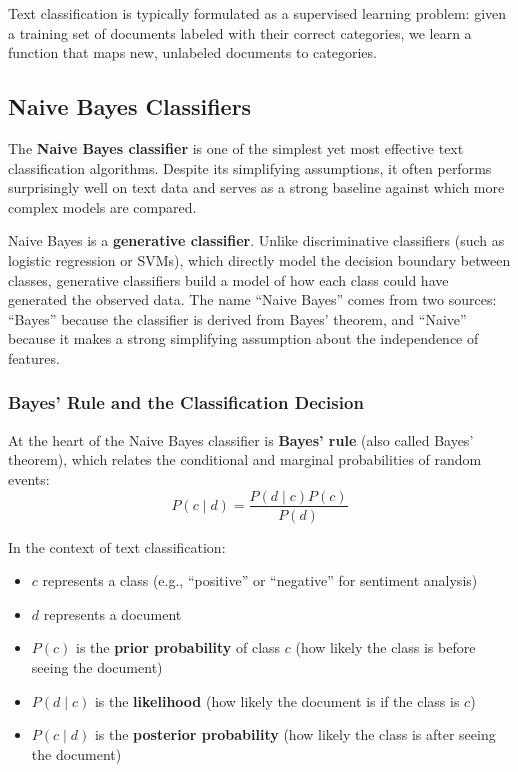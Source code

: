 \documentclass[11pt,a4paper]{article}
\begin{document}
Text classification is typically formulated as a supervised learning problem: given a training set of documents labeled with their correct categories, we learn a function that maps new, unlabeled documents to categories.

\subsection{Naive Bayes Classifiers}

The \textbf{Naive Bayes classifier} is one of the simplest yet most effective text classification algorithms. Despite its simplifying assumptions, it often performs surprisingly well on text data and serves as a strong baseline against which more complex models are compared.

Naive Bayes is a \textbf{generative classifier}. Unlike discriminative classifiers (such as logistic regression or SVMs), which directly model the decision boundary between classes, generative classifiers build a model of how each class could have generated the observed data. The name ``Naive Bayes'' comes from two sources: ``Bayes'' because the classifier is derived from Bayes' theorem, and ``Naive'' because it makes a strong simplifying assumption about the independence of features.

\subsubsection{Bayes' Rule and the Classification Decision}

At the heart of the Naive Bayes classifier is \textbf{Bayes' rule} (also called Bayes' theorem), which relates the conditional and marginal probabilities of random events:
\[
P(c \mid d) = \frac{P(d \mid c) P(c)}{P(d)}
\]

In the context of text classification:
\begin{itemize}
    \item $c$ represents a class (e.g., ``positive'' or ``negative'' for sentiment analysis)
    \item $d$ represents a document
    \item $P(c)$ is the \textbf{prior probability} of class $c$ (how likely the class is before seeing the document)
    \item $P(d \mid c)$ is the \textbf{likelihood} (how likely the document is if the class is $c$)
    \item $P(c \mid d)$ is the \textbf{posterior probability} (how likely the class is after seeing the document)
\end{itemize}
\end{document}
